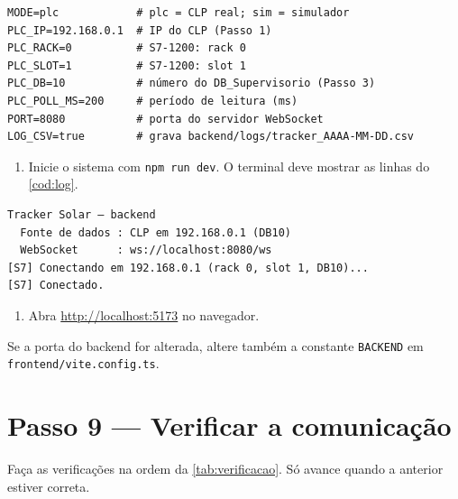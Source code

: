 \documentclass[12pt, oneside, a4paper, chapter=TITLE, section=TITLE, english, brazil]{abntex2}
\begin{document}
\begin{lstlisting}[caption={Configuração do backend/.env para o CLP real}, label={cod:env}]
MODE=plc            # plc = CLP real; sim = simulador
PLC_IP=192.168.0.1  # IP do CLP (Passo 1)
PLC_RACK=0          # S7-1200: rack 0
PLC_SLOT=1          # S7-1200: slot 1
PLC_DB=10           # número do DB_Supervisorio (Passo 3)
PLC_POLL_MS=200     # período de leitura (ms)
PORT=8080           # porta do servidor WebSocket
LOG_CSV=true        # grava backend/logs/tracker_AAAA-MM-DD.csv
\end{lstlisting}

\begin{enumerate}[label=\arabic*., resume]
  \item Inicie o sistema com \texttt{npm run dev}. O terminal deve mostrar as linhas do \autoref{cod:log}.
\end{enumerate}

\begin{lstlisting}[caption={Saída esperada do backend}, label={cod:log}]
  Tracker Solar — backend
  Fonte de dados : CLP em 192.168.0.1 (DB10)
  WebSocket      : ws://localhost:8080/ws
[S7] Conectando em 192.168.0.1 (rack 0, slot 1, DB10)...
[S7] Conectado.
\end{lstlisting}

\begin{enumerate}[label=\arabic*., resume]
  \item Abra \url{http://localhost:5173} no navegador.
\end{enumerate}

Se a porta do backend for alterada, altere também a constante \texttt{BACKEND} em \texttt{frontend/vite.config.ts}.

\chapter{Passo 9 --- Verificar a comunicação}\label{cap:teste}

Faça as verificações na ordem da \autoref{tab:verificacao}. Só avance quando a anterior estiver correta.
\end{document}
